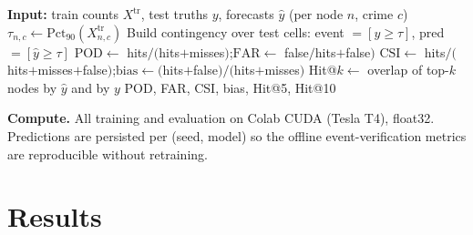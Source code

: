 \documentclass[11pt,conference]{IEEEtran}
\begin{document}
\begin{algorithm}[t]
\caption{Leak-free per-node event verification}\label{alg:event}
\begin{algorithmic}[1]
\State \textbf{Input:} train counts $X^{\mathrm{tr}}$, test truths $y$, forecasts $\hat y$ (per node $n$, crime $c$)
  \State $\tau_{n,c} \gets \mathrm{Pct}_{90}(X^{\mathrm{tr}}_{n,c})$ 
\EndFor
\State Build contingency over test cells: event $=[y\ge\tau]$, pred$=[\hat y\ge\tau]$
\State $\mathrm{POD}\gets$ hits$/($hits$+$misses$)$;\quad $\mathrm{FAR}\gets$ false$/$hits$+$false$)$
\State $\mathrm{CSI}\gets$ hits$/($hits$+$misses$+$false$)$;\quad $\mathrm{bias}\gets($hits$+$false$)/($hits$+$misses$)$
\State Hit@$k\gets$ overlap of top-$k$ nodes by $\hat y$ and by $y$
\State \Return POD, FAR, CSI, bias, Hit@5, Hit@10
\end{algorithmic}
\end{algorithm}

\textbf{Compute.} All training and evaluation on Colab CUDA (Tesla T4),
float32. Predictions are persisted per (seed, model) so the offline
event-verification metrics are reproducible without retraining.

\section{Results}\label{sec:results}
\end{document}
